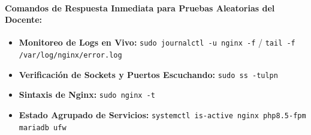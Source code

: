 \documentclass[12pt,a4paper]{article}
\begin{document}
\paragraph{Comandos de Respuesta Inmediata para Pruebas Aleatorias del Docente:}
\begin{itemize}
    \item \textbf{Monitoreo de Logs en Vivo:} \texttt{sudo journalctl -u nginx -f} / \texttt{tail -f /var/log/nginx/error.log}
    \item \textbf{Verificación de Sockets y Puertos Escuchando:} \texttt{sudo ss -tulpn}
    \item \textbf{Sintaxis de Nginx:} \texttt{sudo nginx -t}
    \item \textbf{Estado Agrupado de Servicios:} \texttt{systemctl is-active nginx php8.5-fpm mariadb ufw}
\end{itemize}
\end{document}
